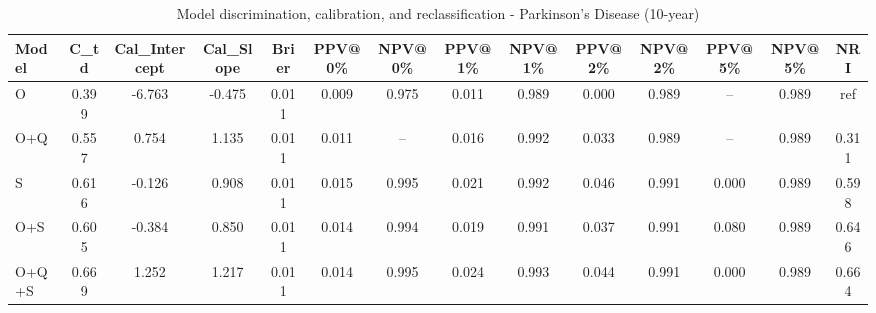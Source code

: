 \begin{table}[htbp]
\centering
\small
\caption{Model discrimination, calibration, and reclassification - Parkinson's Disease (10-year)}
\label{tab:perf_pd_10y}
\begin{tabular}{lccccccccccccc}
\toprule
Model & C\_td & Cal\_Intercept & Cal\_Slope & Brier & PPV@0\% & NPV@0\% & PPV@1\% & NPV@1\% & PPV@2\% & NPV@2\% & PPV@5\% & NPV@5\% & NRI \\
\midrule
O & 0.399 & -6.763 & -0.475 & 0.011 & 0.009 & 0.975 & 0.011 & 0.989 & 0.000 & 0.989 & -- & 0.989 & ref \\
O+Q & 0.557 & 0.754 & 1.135 & 0.011 & 0.011 & -- & 0.016 & 0.992 & 0.033 & 0.989 & -- & 0.989 & 0.311 \\
S & 0.616 & -0.126 & 0.908 & 0.011 & 0.015 & 0.995 & 0.021 & 0.992 & 0.046 & 0.991 & 0.000 & 0.989 & 0.598 \\
O+S & 0.605 & -0.384 & 0.850 & 0.011 & 0.014 & 0.994 & 0.019 & 0.991 & 0.037 & 0.991 & 0.080 & 0.989 & 0.646 \\
O+Q+S & 0.669 & 1.252 & 1.217 & 0.011 & 0.014 & 0.995 & 0.024 & 0.993 & 0.044 & 0.991 & 0.000 & 0.989 & 0.664 \\
\bottomrule
\end{tabular}
\end{table}
